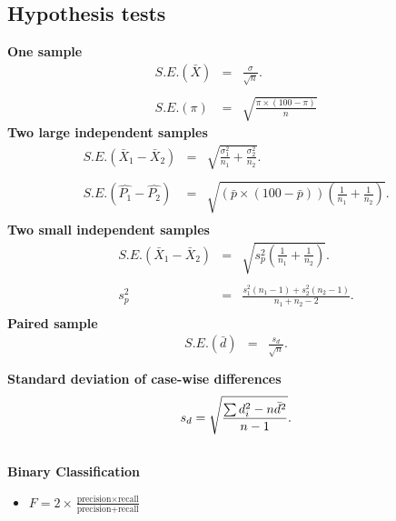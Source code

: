 \documentclass[a4paper,12pt]{article}
\begin{document}
\subsection*{Hypothesis tests}
{\bf One sample}
\begin{eqnarray*}
S.E.(\bar{X})&=&\frac{\sigma}{\sqrt{n}}.\\\\
S.E.(\pi)&=&\sqrt{\frac{\pi\times(100-\pi)}{n}}
\end{eqnarray*}
{\bf Two large independent samples}
\begin{eqnarray*}
S.E.(\bar{X}_1-\bar{X}_2)&=&\sqrt{\frac{\sigma^2_1}{n_1}+\frac{\sigma_2^2}{n_2}}.\\\\
S.E.(\hat{P_1}-\hat{P_2})&=&\sqrt{\left(\bar{p}\times(100-\bar{p})\right)\left(\frac{1}{n_1}+\frac{1}{n_2}\right)}.\\
\end{eqnarray*}
{\bf Two small independent samples}
\begin{eqnarray*}
S.E.(\bar{X}_1-\bar{X}_2)&=&\sqrt{s_p^2\left(\frac{1}{n_1}+\frac{1}{n_2}\right)}.\\\\
s_p^2&=&\frac{s_1^2(n_1-1)+s_2^2(n_2-1)}{n_1+n_2-2}.\\
\end{eqnarray*}
{\bf Paired sample}
\begin{eqnarray*}
S.E.(\bar{d})&=&\frac{s_d}{\sqrt{n}}.\\\\
\end{eqnarray*}
{\bf Standard deviation of case-wise differences}
\begin{eqnarray*}
s_d = \sqrt{ {\sum d_i^2 - n\bar{d}^2 \over n-1}}.\\\\
\end{eqnarray*}
{\bf Binary Classification}
\begin{itemize}
\item $F = 2 \times \frac{\mbox{precision} \times \mbox{recall}}{ \mbox{precision} + \mbox{recall}}$

\end{itemize}
\end{document}
